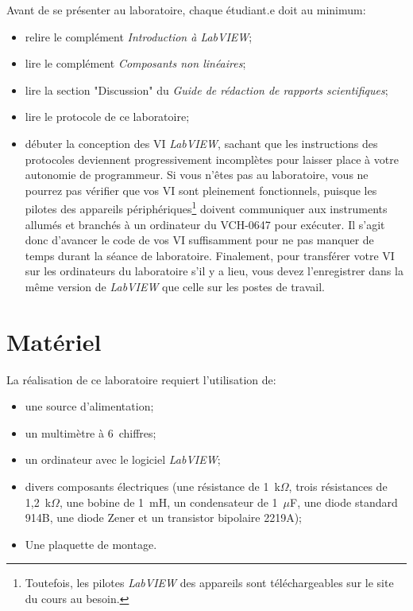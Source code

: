 \documentclass[canadien,12pt,oneside,letterpaper]{article}
\begin{document}
\noindent Avant de se présenter au laboratoire, chaque étudiant.e doit au minimum:
\vspace{1ex}
\begin{itemize}
\item relire le complément \textit{Introduction à LabVIEW};
\item lire le complément \textit{Composants non linéaires};
\item lire la section "Discussion" du \textit{Guide de rédaction de rapports scientifiques};
\item lire le protocole de ce laboratoire;
\item débuter la conception des VI \textit{LabVIEW}, sachant que les instructions des protocoles deviennent progressivement incomplètes pour laisser place à votre autonomie de programmeur. Si vous n'êtes pas au laboratoire, vous ne pourrez pas vérifier que vos VI sont pleinement fonctionnels, puisque les pilotes des appareils périphériques\footnote{Toutefois, les pilotes \textit{LabVIEW} des appareils sont téléchargeables sur le site du cours au besoin.} doivent communiquer aux instruments allumés et branchés à un ordinateur du VCH-0647 pour exécuter. Il s'agit donc d'avancer le code de vos VI suffisamment pour ne pas manquer de temps durant la séance de laboratoire. Finalement, pour transférer votre VI sur les ordinateurs du laboratoire s'il y a lieu, vous devez l'enregistrer dans la même version de \textit{LabVIEW} que celle sur les postes de travail.
\end{itemize}


\section{Matériel}

\noindent La réalisation de ce laboratoire requiert l'utilisation de:
\vspace{1ex}
\begin{itemize}
\item une source d'alimentation;
\item un multimètre à 6\textonehalf~chiffres;
\item un ordinateur avec le logiciel \textit{LabVIEW};
\item divers composants électriques (une résistance de 1~k$\Omega$, trois résistances de 1,2~k$\Omega$, une bobine de 1~mH, un condensateur de 1~$\mu$F, une diode standard 914B, une diode Zener et un transistor bipolaire 2219A);
\item Une plaquette de montage.
\end{itemize}
\end{document}

